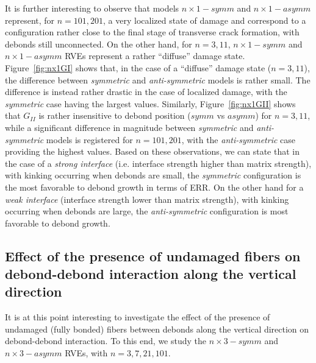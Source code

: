 \documentclass[smallextended]{svjour3}       %
\begin{document}
It is further interesting to observe that models $n\times1-symm$ and $n\times1-asymm$ represent, for $n=101,201$, a very localized state of damage and correspond to a configuration rather close to the final stage of transverse crack formation, with debonds still unconnected. On the other hand, for $n=3,11$, $n\times1-symm$ and $n\times1-asymm$ RVEs represent a rather ``diffuse'' damage state. Figure~\ref{fig:nx1GI} shows that, in the case of a ``diffuse'' damage state ($n=3,11$), the difference between \textit{symmetric} and \textit{anti-symmetric} models is rather small. The difference is instead rather drastic in the case of localized damage, with the \textit{symmetric} case having the largest values. Similarly, Figure~\ref{fig:nx1GII} shows that $G_{II}$ is rather insensitive to debond position ($symm$ vs $asymm$) for $n=3,11$, while a significant difference in magnitude between \textit{symmetric} and \textit{anti-symmetric} models is registered for $n=101,201$, with the \textit{anti-symmetric} case providing the highest values. Based on these observations, we can state that in the case of a \emph{strong interface} (i.e. interface strength higher than matrix strength), with kinking occurring when debonds are small, the \textit{symmetric} configuration is the most favorable to debond growth in terms of ERR. On the other hand for a \emph{weak interface} (interface strength lower than matrix strength), with kinking occurring when debonds are large, the \textit{anti-symmetric} configuration is most favorable to debond growth.

\subsection{Effect of the presence of undamaged fibers on debond-debond interaction along the vertical direction}\label{subsec:fibersinbetween}

It is at this point interesting to investigate the effect of the presence of undamaged (fully bonded) fibers between debonds along the vertical direction on debond-debond interaction. To this end, we study the $n\times 3-symm$ and $n\times 3-asymm$ RVEs, with $n=3,7,21,101$.
\end{document}
